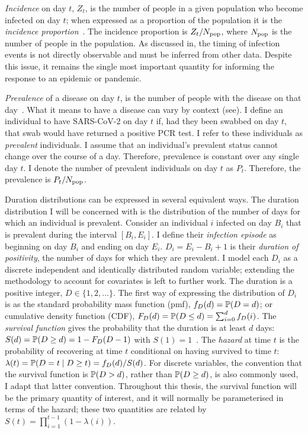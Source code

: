 \documentclass[thesis.tex]{subfiles}
\begin{document}
\emph{Incidence} on day $t$, $Z_t$, is the number of people in a given population who become infected on day $t$; when expressed as a proportion of the population it is the \emph{incidence proportion}~\autocite[89]{lashModern}.
The incidence proportion is $Z_t/N_\text{pop}$, where $N_\text{pop}$ is the number of people in the population.
As discussed in, the timing of infection events is not directly observable and must be inferred from other data.
Despite this issue, it remains the single most important quantity for informing the response to an epidemic or pandemic.

\emph{Prevalence} of a disease on day $t$, is the number of people with the disease on that day~\autocite[90]{lashModern}.
What it means to have a disease can vary by context (see).
I define an individual to have SARS-CoV-2 on day $t$ if, had they been swabbed on day $t$, that swab would have returned a positive PCR test.
I refer to these individuals as \emph{prevalent} individuals.
I assume that an individual's prevalent status cannot change over the course of a day.
Therefore, prevalence is constant over any single day $t$.
I denote the number of prevalent individuals on day $t$ as $P_t$.
Therefore, the prevalence is $P_t/N_\text{pop}$.

Duration distributions can be expressed in several equivalent ways.
The duration distribution I will be concerned with is the distribution of the number of days for which an individual is prevalent.
Consider an individual $i$ infected on day $B_i$ that is prevalent during the interval $[B_i, E_i]$.
I define their \emph{infection episode} as beginning on day $B_i$ and ending on day $E_i$.
$D_i = E_i - B_i + 1$ is their \emph{duration of positivity}, the number of days for which they are prevalent.
I model each $D_i$ as a discrete independent and identically distributed random variable; extending the methodology to account for covariates is left to further work.
The duration is a positive integer, \ie $D \in \{1, 2, \dots\}$.
The first way of expressing the distribution of $D_i$ is as the standard probability mass function (pmf), $f_{D}(d) = \operatorname{\mathbb{P}}(D = d)$; or cumulative density function (CDF), $F_{D}(d) = \operatorname{\mathbb{P}}(D \leq d) = \sum_{i=0}^d f_{D}(i)$.
The \emph{survival function} gives the probability that the duration is at least $d$ days: $S(d) = \operatorname{\mathbb{P}}(D \geq d) = 1 - F_{D}(D - 1)$ with $S(1) = 1$~\autocite{yanDistribution}.
The \emph{hazard} at time $t$ is the probability of recovering at time $t$ conditional on having survived to time $t$: $\lambda(t) = \operatorname{\mathbb{P}}(D = t \mid D \geq t) = f_{D}(d) / S(d)$.
For discrete variables, the convention that the survival function is $\operatorname{\mathbb{P}}(D >d)$, rather than $\operatorname{\mathbb{P}}(D \geq d)$, is also commonly used, I adapt that latter convention.
Throughout this thesis, the survival function will be the primary quantity of interest, and it will normally be parameterised in terms of the hazard; these two quantities are related by $S(t) = \prod_{i=1}^{t-1} (1 - \lambda(i))$.
\end{document}
